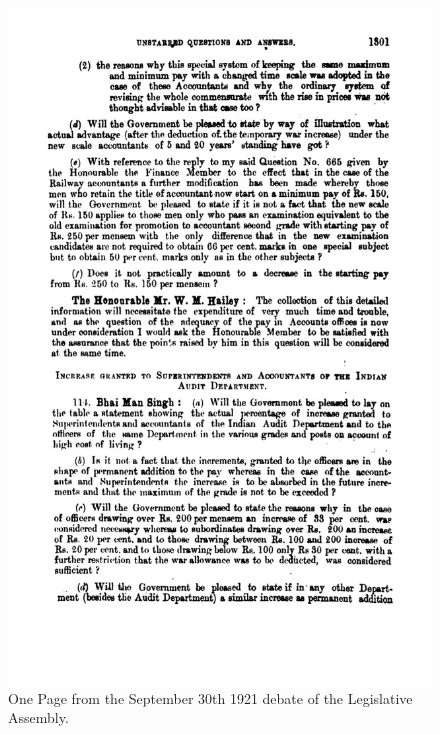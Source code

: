 \documentclass[12pt,letter]{article}
\begin{document}
\begin{figure}
    \centering
    \includegraphics[width=0.85\linewidth]{../figs/example_page.jpg}
    \caption{One Page from the September 30th 1921 debate of the Legislative Assembly.}
    \label{fig:example_page}
\end{figure}
\end{document}
